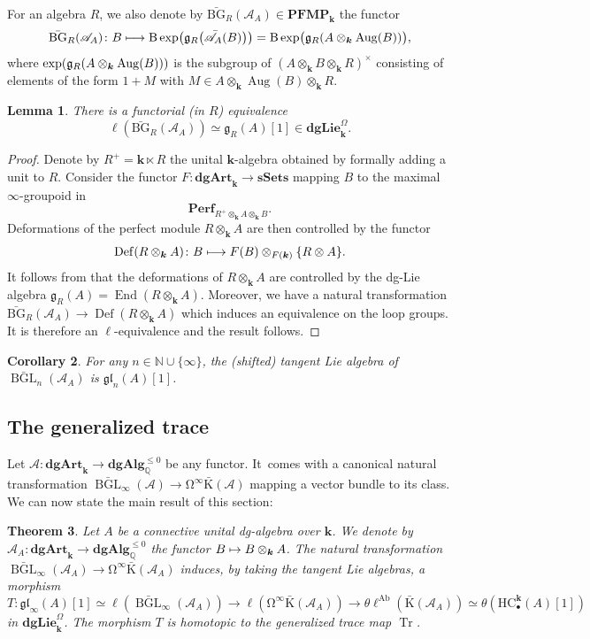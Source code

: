\documentclass[JEP,XML,SOM,Unicode,NoEqCountersInSection]{cedram}
\let\mathcal\mathscr
\newcommand\mto{\mathchoice{\longmapsto}{\mapsto}{\mapsto}{\mapsto}}
\let\widebar\bar
\newcommand{\sbullet}{{\scriptscriptstyle\bullet}}
\newtheorem{thm}{Theorem}[subsection]
\newtheorem{lem}[thm]{Lemma}
\newtheorem{cor}[thm]{Corollary}
\theoremstyle{definition}
\newcommand{\N}{\mathbb{N}}
\newcommand{\Q}{\mathbb{Q}}
\newcommand{\sSets}{\mathbf{sSets}}
\newcommand{\dgArt}{\mathbf{dgArt}}
\newcommand{\dgLie}{\mathbf{dgLie}}
\newcommand{\dgAlg}{\mathbf{dgAlg}}
\newcommand{\Perf}{\mathbf{Perf}}
\DeclareMathOperator{\BGL}{BGL}
\DeclareMathOperator{\End}{End}
\newcommand{\B}{\mathrm{B}}
\newcommand{\gl}{\mathfrak{gl}}
\let\originalleft\left
\let\originalright\right
\renewcommand{\left}{\mathopen{}\mathclose\bgroup\originalleft}
\renewcommand{\right}{\aftergroup\egroup\originalright}
\newcommand{\bK}{\widebar{\mathrm{K}}}
\newcommand{\bBGL}{\widebar{\BGL}}
\newcommand{\HC}{\mathrm{HC}}
\newcommand{\Aug}{\operatorname{Aug}}
\newcommand{\infloop}{\operatorname{\Omega^\infty}}
\renewcommand{\k}{{\boldsymbol{k}}}
\newcommand{\ellAb}{\operatorname{\ell^{Ab}}}
\newcommand{\Ac}{\mathcal{A}}
\newcommand{\bAc}{\widebar{\mathcal{A}}}
\newcommand{\PFMP}{\mathbf{PFMP}}
\newcommand{\Tr}{\operatorname{Tr}}
\newcommand{\g}{\mathfrak{g}}
\newcommand{\bBG}{\widebar{\mathrm{BG}}}
\begin{document}
For an algebra $R$, we also denote by $\bBG_R(\Ac_A) \in \PFMP_\k$ the functor
\[
\bBG_R(\Ac_A) \colon B \mto \B \exp\left(\g_R\left(\bAc_A(B)\right)\right) = \B \exp\bigl(\g_R\left(A \otimes_\k \Aug(B)\right)\bigr),
\]
where $\exp\left(\g_R\left(A \otimes_\k \Aug(B)\right)\right)$ is the subgroup of $(A \otimes_\k B \otimes_\k R)^{\times}$ consisting of elements of the form $1 + M$ with $M \in A \otimes_\k \Aug(B) \otimes_\k R$.

\begin{lem}\label{lem:tgtBGL}
There is a functorial (in $R$) equivalence
\[
\ell(\bBG_R(\Ac_A)) \simeq \g_R(A)[1] \in \dgLie_\k^\Omega.
\]
\end{lem}
\begin{proof}
Denote by $R^+ = \k \ltimes R$ the unital $\k$-algebra obtained by formally adding a unit to $R$.
Consider the functor $F \colon \dgArt_\k \to \sSets$ mapping $B$ to the maximal $\infty$-groupoid in
\[
\Perf_{R^+ \otimes_\k A \otimes_\k B}.
\]
Deformations of the perfect module $R \otimes_\k A$ are then controlled by the functor
\[
\operatorname{Def}(R \otimes_\k A) \colon B \mto F(B) \otimes_{F(\k)} \{R \otimes A\}.
\]
It follows from \cite[Cor.\,5.2.15 and Th.\,3.3.1]{lurie:dagx} that the deformations of $R \otimes_\k A$ are controlled by the dg-Lie algebra $\g_R(A) = \End(R \otimes_\k A)$.
Moreover, we have a natural transformation $\bBG_R(\Ac_A) \to \operatorname{Def}(R \otimes_\k A)$ which induces an equivalence on the loop groups. It is therefore an $\ell$-equivalence and the result follows.
\end{proof}

\begin{cor}
For any $n \in \N \cup \{\infty\}$, the (shifted) tangent Lie algebra of $\bBGL_n(\Ac_A)$ is $\gl_n(A)[1]$.
\end{cor}

\subsection{The generalized trace}
Let $\Ac \colon \dgArt_\k \to \dgAlg_\Q^{\leq 0}$ be any functor.
It~comes with a canonical natural transformation $\bBGL_\infty(\Ac) \to \infloop \bK(\Ac)$ mapping a vector bundle to its class.
We can now state the main result of this section:
\begin{thm}\label{thm:compLQT}
Let $A$ be a connective unital dg-algebra over $\k$. We denote by $\Ac_A \colon \dgArt_\k \to \dgAlg^{\leq 0}_\Q$ the functor $B \mto B \otimes_\k A$.
The natural transformation $\bBGL_\infty(\Ac_A) \to \infloop\bK(\Ac_A)$ induces, by taking the tangent Lie algebras, a morphism
\[
T \colon \gl_\infty(A)[1] \simeq \ell(\bBGL_\infty(\Ac_A)) \to \ell(\infloop\bK(\Ac_A)) \to \theta\ellAb(\bK(\Ac_A)) \simeq \theta(\HC_\sbullet^\k(A)[1])
\]
in $\dgLie_\k^\Omega$.
The morphism $T$ is homotopic to the generalized trace map $\Tr$.
\end{thm}
\end{document}
